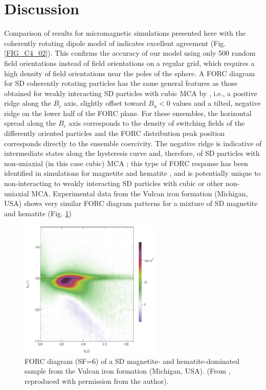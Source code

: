 \section{Discussion}
Comparison of results for micromagnetic simulations presented here with the coherently rotating dipole model of \citet{ValdezGrijalva2017} indicates excellent agreement (Fig. \ref{FIG_C4_02}). This confirms the accuracy of our model using only 500 random field orientations instead of field orientations on a regular grid, which requires a high density of field orientations near the poles of the sphere. A FORC diagram for SD coherently rotating particles has the same general features as those obtained for weakly interacting SD particles with cubic MCA by \citet{Harrison2014}, i.e., a positive ridge along the $B_c$ axis, slightly offset toward $B_u<0$ values and a tilted, negative ridge on the lower half of the FORC plane. For these ensembles, the horizontal spread along the $B_c$ axis corresponds to the density of switching fields of the differently oriented particles and the FORC distribution peak position corresponds directly to the ensemble coercivity. The negative ridge is indicative of intermediate states along the hysteresis curve and, therefore, of SD particles with non-uniaxial (in this case cubic) MCA \citep{ValdezGrijalva2017}; this type of FORC response has been identified in simulations for magnetite \citep{Harrison2014} and hematite \citep{Harrison2017}, and is potentially unique to non-interacting to weakly interacting SD particles with cubic or other non-uniaxial MCA. Experimental data from the Vulcan iron formation (Michigan, USA) \citep{Laird2017} shows very similar FORC diagram patterns for a mixture of SD magnetite and hematite (Fig. \ref{FIG_C4_Laird2017})
\begin{figure}
\centering
\includegraphics[width=0.6\textwidth]{research-3/figs/Laird2017_thesis.pdf}
\caption[FORC diagram of a SD magnetite and hematite sample]{FORC diagram (SF=6) of a SD magnetite- and hematite-dominated sample from the Vulcan iron formation (Michigan, USA). (From \citet{Laird2017}, reproduced with permission from the author).}
\label{FIG_C4_Laird2017}
\end{figure}\par

